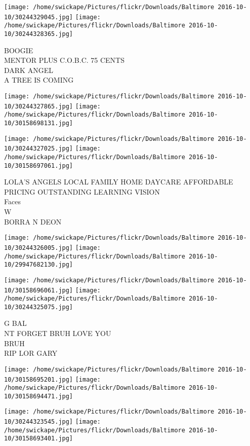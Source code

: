 \documentclass[10pt,letterpaper]{article}
\begin{document}
\texttt{[image: /home/swickape/Pictures/flickr/Downloads/Baltimore 2016-10-10/30244329045.jpg]}
\texttt{[image: /home/swickape/Pictures/flickr/Downloads/Baltimore 2016-10-10/30244328365.jpg]}

BOOGIE\\
MENTOR PLUS C.O.B.C. 75 CENTS\\
DARK ANGEL\\
A TREE IS COMING\\
\pagebreak

\texttt{[image: /home/swickape/Pictures/flickr/Downloads/Baltimore 2016-10-10/30244327865.jpg]}
\texttt{[image: /home/swickape/Pictures/flickr/Downloads/Baltimore 2016-10-10/30158698131.jpg]}

\texttt{[image: /home/swickape/Pictures/flickr/Downloads/Baltimore 2016-10-10/30244327025.jpg]}
\texttt{[image: /home/swickape/Pictures/flickr/Downloads/Baltimore 2016-10-10/30158697061.jpg]}

LOLA'S ANGELS LOCAL FAMILY HOME DAYCARE AFFORDABLE PRICING OUTSTANDING LEARNING VISION\\
Faces\\
W\\
BORRA N DEON\\
\pagebreak

\texttt{[image: /home/swickape/Pictures/flickr/Downloads/Baltimore 2016-10-10/30244326005.jpg]}
\texttt{[image: /home/swickape/Pictures/flickr/Downloads/Baltimore 2016-10-10/29947682130.jpg]}

\texttt{[image: /home/swickape/Pictures/flickr/Downloads/Baltimore 2016-10-10/30158696061.jpg]}
\texttt{[image: /home/swickape/Pictures/flickr/Downloads/Baltimore 2016-10-10/30244325075.jpg]}

G BAL\\
NT FORGET BRUH LOVE YOU\\
BRUH\\
RIP LOR GARY\\
\pagebreak

\texttt{[image: /home/swickape/Pictures/flickr/Downloads/Baltimore 2016-10-10/30158695201.jpg]}
\texttt{[image: /home/swickape/Pictures/flickr/Downloads/Baltimore 2016-10-10/30158694471.jpg]}

\texttt{[image: /home/swickape/Pictures/flickr/Downloads/Baltimore 2016-10-10/30244323545.jpg]}
\texttt{[image: /home/swickape/Pictures/flickr/Downloads/Baltimore 2016-10-10/30158693401.jpg]}
\end{document}
